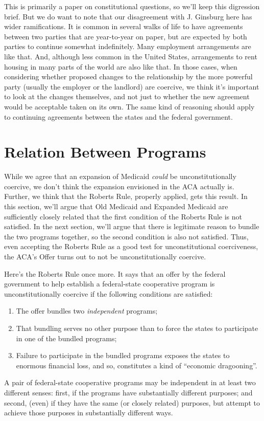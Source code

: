 This is primarily a paper on constitutional questions, so we'll keep this digression brief. But we do want to note that our disagreement with J. Ginsburg here has wider ramifications. It is common in several walks of life to have agreements between two parties that are year-to-year on paper, but are expected by both parties to continue somewhat indefinitely. Many employment arrangements are like that. And, although less common in the United States, arrangements to rent housing in many parts of the world are also like that. In those cases, when considering whether proposed changes to the relationship by the more powerful party (usually the employer or the landlord) are coercive, we think it's important to look at the changes themselves, and not just to whether the new agreement would be acceptable taken on its own. The same kind of reasoning should apply to continuing agreements between the states and the federal government.

\section{Relation Between Programs
}
While we agree that an expansion of Medicaid \emph{could} be unconstitutionally coercive, we don't think the expansion envisioned in the ACA actually is. Further, we think that the Roberts Rule, properly applied, gets this result. In this section, we'll argue that Old Medicaid and Expanded Medicaid are sufficiently closely related that the first condition of the Roberts Rule is not satisfied. In the next section, we'll argue that there is legitimate reason to bundle the two programs together, so the second condition is also not satisfied. Thus, even accepting the Roberts Rule as a good test for unconstitutional coerciveness, the ACA's Offer turns out to not be unconstitutionally coercive.

Here's the Roberts Rule once more. It says that an offer by the federal government to help establish a federal-state cooperative program is unconstitutionally coercive if the following conditions are satisfied: 

\begin{enumerate}
\item The offer bundles two \emph{independent} programs;

\item That bundling serves no other purpose than to force the states to participate in one of the bundled programs;

\item Failure to participate in the bundled programs exposes the states to enormous financial loss, and so, constitutes a kind of ``economic dragooning''.

\end{enumerate}
A pair of federal-state cooperative programs may be independent in at least two different senses: first, if the programs have substantially different purposes; and second, (even) if they have the same (or closely related) purposes, but attempt to achieve those purposes in substantially different ways.

